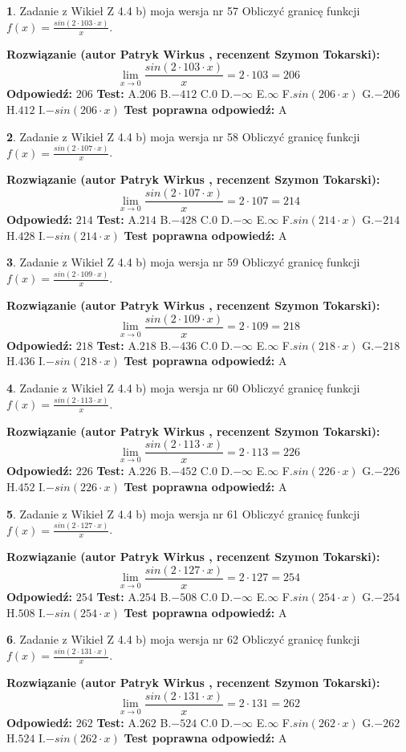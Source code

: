 \documentclass[12pt, a4paper]{article}
\theoremstyle{definition} %
\newtheorem{zad}{}
\newcommand{\zadStart}[1]{\begin{zad}#1\newline}
\newcommand{\zadStop}{\end{zad}}
\newcommand{\rozwStart}[2]{\noindent \textbf{Rozwiązanie (autor #1 , recenzent #2): }\newline}
\newcommand{\rozwStop}{\newline}
\newcommand{\odpStart}{\noindent \textbf{Odpowiedź:}\newline}
\newcommand{\odpStop}{\newline}
\newcommand{\testStart}{\noindent \textbf{Test:}\newline}
\newcommand{\testStop}{\newline}
\newcommand{\kluczStart}{\noindent \textbf{Test poprawna odpowiedź:}\newline}
\newcommand{\kluczStop}{\newline}
\begin{document}
\zadStart{Zadanie z Wikieł Z 4.4 b) moja wersja nr 57}
Obliczyć granicę funkcji $f(x)=\frac{sin(2 \cdot103\cdot x)}{x}$.
\zadStop
\rozwStart{Patryk Wirkus}{Szymon Tokarski}
$$\lim\limits_{x\to 0}\frac{sin(2 \cdot 103\cdot x)}{x}=
2 \cdot 103 = 206$$
\rozwStop
\odpStart
$206$
\odpStop
\testStart
A.$206$
B.$-412$
C.$0$
D.$-\infty$
E.$\infty$
F.$sin(206\cdot x)$
G.$-206$
H.$412$
I.$-sin(206\cdot x)$
\testStop
\kluczStart
A
\kluczStop



\zadStart{Zadanie z Wikieł Z 4.4 b) moja wersja nr 58}
Obliczyć granicę funkcji $f(x)=\frac{sin(2 \cdot107\cdot x)}{x}$.
\zadStop
\rozwStart{Patryk Wirkus}{Szymon Tokarski}
$$\lim\limits_{x\to 0}\frac{sin(2 \cdot 107\cdot x)}{x}=
2 \cdot 107 = 214$$
\rozwStop
\odpStart
$214$
\odpStop
\testStart
A.$214$
B.$-428$
C.$0$
D.$-\infty$
E.$\infty$
F.$sin(214\cdot x)$
G.$-214$
H.$428$
I.$-sin(214\cdot x)$
\testStop
\kluczStart
A
\kluczStop



\zadStart{Zadanie z Wikieł Z 4.4 b) moja wersja nr 59}
Obliczyć granicę funkcji $f(x)=\frac{sin(2 \cdot109\cdot x)}{x}$.
\zadStop
\rozwStart{Patryk Wirkus}{Szymon Tokarski}
$$\lim\limits_{x\to 0}\frac{sin(2 \cdot 109\cdot x)}{x}=
2 \cdot 109 = 218$$
\rozwStop
\odpStart
$218$
\odpStop
\testStart
A.$218$
B.$-436$
C.$0$
D.$-\infty$
E.$\infty$
F.$sin(218\cdot x)$
G.$-218$
H.$436$
I.$-sin(218\cdot x)$
\testStop
\kluczStart
A
\kluczStop



\zadStart{Zadanie z Wikieł Z 4.4 b) moja wersja nr 60}
Obliczyć granicę funkcji $f(x)=\frac{sin(2 \cdot113\cdot x)}{x}$.
\zadStop
\rozwStart{Patryk Wirkus}{Szymon Tokarski}
$$\lim\limits_{x\to 0}\frac{sin(2 \cdot 113\cdot x)}{x}=
2 \cdot 113 = 226$$
\rozwStop
\odpStart
$226$
\odpStop
\testStart
A.$226$
B.$-452$
C.$0$
D.$-\infty$
E.$\infty$
F.$sin(226\cdot x)$
G.$-226$
H.$452$
I.$-sin(226\cdot x)$
\testStop
\kluczStart
A
\kluczStop



\zadStart{Zadanie z Wikieł Z 4.4 b) moja wersja nr 61}
Obliczyć granicę funkcji $f(x)=\frac{sin(2 \cdot127\cdot x)}{x}$.
\zadStop
\rozwStart{Patryk Wirkus}{Szymon Tokarski}
$$\lim\limits_{x\to 0}\frac{sin(2 \cdot 127\cdot x)}{x}=
2 \cdot 127 = 254$$
\rozwStop
\odpStart
$254$
\odpStop
\testStart
A.$254$
B.$-508$
C.$0$
D.$-\infty$
E.$\infty$
F.$sin(254\cdot x)$
G.$-254$
H.$508$
I.$-sin(254\cdot x)$
\testStop
\kluczStart
A
\kluczStop



\zadStart{Zadanie z Wikieł Z 4.4 b) moja wersja nr 62}
Obliczyć granicę funkcji $f(x)=\frac{sin(2 \cdot131\cdot x)}{x}$.
\zadStop
\rozwStart{Patryk Wirkus}{Szymon Tokarski}
$$\lim\limits_{x\to 0}\frac{sin(2 \cdot 131\cdot x)}{x}=
2 \cdot 131 = 262$$
\rozwStop
\odpStart
$262$
\odpStop
\testStart
A.$262$
B.$-524$
C.$0$
D.$-\infty$
E.$\infty$
F.$sin(262\cdot x)$
G.$-262$
H.$524$
I.$-sin(262\cdot x)$
\testStop
\kluczStart
A
\kluczStop
\end{document}
